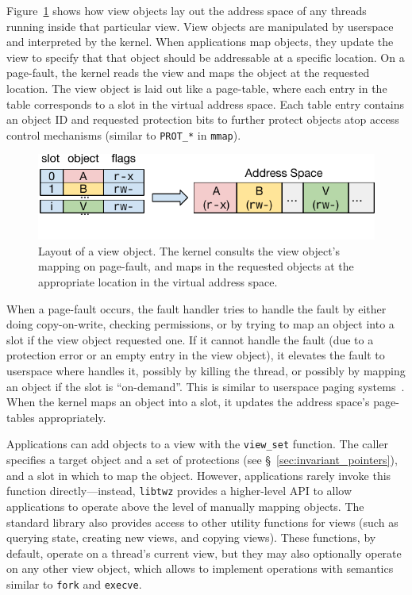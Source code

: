 {    Figure~\ref{fig:view} shows how view objects lay out the address space of any threads running inside
    that particular view. View objects are manipulated by userspace and interpreted by the kernel. When
    applications map objects, they update the view to specify that that object should be addressable at
    a specific location. On a page-fault, the kernel reads the view and maps the object at the requested
    location. The view object is laid out like a page-table, where each entry in the table corresponds
    to a slot in the virtual address space. Each table entry contains an object ID and requested
    protection bits to further protect objects atop access control mechanisms (similar to
    \texttt{PROT\_*} in \texttt{mmap}).

    \begin{figure}
        \centering
        \includegraphics[width=\linewidth]{fig/view}
        \caption{Layout of a view object. The kernel consults the view object's mapping on page-fault,
            and maps in the requested objects at the appropriate location in the virtual address space.}
        \label{fig:view}
    \end{figure}

    When a page-fault occurs, the fault handler tries to handle the fault by either doing copy-on-write,
    checking permissions, or by trying to map an object into a slot if the view object requested one.
    If it cannot handle the fault (due to a protection error or an empty entry in the view
    object), it elevates the fault to userspace where \libcore handles it, possibly by killing the
    thread, or possibly by mapping an object if the slot is ``on-demand''. This is similar to userspace
    paging systems~\cite{l4,accetta:usenix86s}. When the kernel
    maps an object into a slot, it updates the address space's page-tables appropriately.

    Applications can add objects to a view with the \texttt{view\_set} function. The caller specifies a
    target object and a set of protections (see \S~\ref{sec:invariant_pointers}), and a slot in which to
    map the object. However, applications rarely invoke this function directly---instead,
    \texttt{libtwz} provides a higher-level API to allow applications to operate above the level of
    manually mapping objects. The standard library also provides access to other utility functions for
    views (such as querying state, creating new views, and copying views). These functions, by default,
    operate on a thread's current view, but they may also optionally operate on any other view object,
    which allows \Twizzler to implement operations with semantics similar to \texttt{fork} and \texttt{execve}.

}
